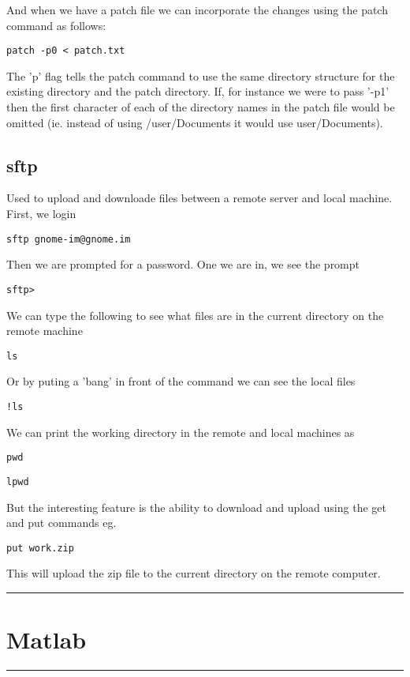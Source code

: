 \documentclass[a4paper, 10pt]{article}
\newcommand{\mytoprule}{\hrule\vspace{4mm}}
\newcommand{\mybotrule}{\vspace{4mm}\hrule}
\begin{document}
And when we have a patch file we can incorporate the changes using the
patch command as follows:
\begin{verbatim}
patch -p0 < patch.txt
\end{verbatim}
The 'p' flag tells the patch command to use the same directory
structure for the existing directory and the patch directory. If, for
instance we were to pass '-p1' then the first character of each of the
directory names in the patch file would be omitted (ie. instead of
using /user/Documents it would use user/Documents).

\subsection*{sftp}
Used to upload and downloade files between a remote server and local machine. First, we login
\begin{verbatim}
sftp gnome-im@gnome.im
\end{verbatim}
Then we are prompted for a password. One we are in, we see the prompt
\begin{verbatim}
sftp>
\end{verbatim}
We can type the following to see what files are in the current directory on the remote machine
\begin{verbatim}
ls
\end{verbatim}
Or by puting a 'bang' in front of the command we can see the local files
\begin{verbatim}
!ls
\end{verbatim}
We can print the working directory in the remote and local machines as
\begin{verbatim}
pwd
\end{verbatim}
\begin{verbatim}
lpwd
\end{verbatim}
But the interesting feature is the ability to download and upload using the get and put commands
eg.
\begin{verbatim}
put work.zip 
\end{verbatim}
This will upload the zip file to the current directory on the remote computer. 
\mybotrule

\vspace{10mm}
\section*{Matlab}

\mytoprule
\end{document}
